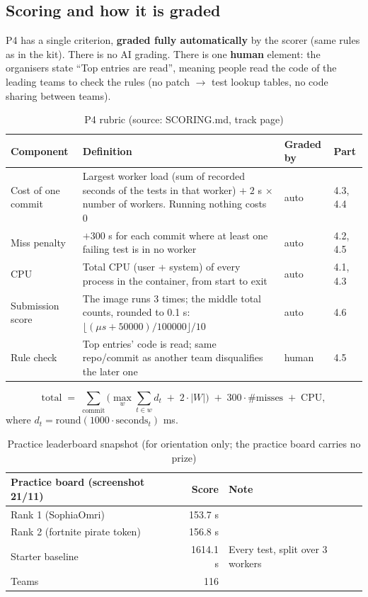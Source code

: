 \documentclass[a4paper,12pt]{article}
\newcommand{\src}[1]{{\footnotesize\textcolor{p7}{(source: #1)}}}
\newcommand{\fn}[1]{\texttt{\detokenize{#1}}}
\begin{document}
\subsection{Scoring and how it is graded}
P4 has a single criterion, \textbf{graded fully automatically} by the scorer (same rules as \fn{score.py} in the kit). There is no AI grading. There is one \textbf{human} element: the organisers state ``Top entries are read'', meaning people read the code of the leading teams to check the rules (no patch $\rightarrow$ test lookup tables, no code sharing between teams).

\begin{table}[H]
\centering\small
\begin{tabularx}{\textwidth}{L{3.6cm}Y C{1.9cm}C{1.4cm}}
\toprule
\textbf{Component} & \textbf{Definition} & \textbf{Graded by} & \textbf{Part} \\
\midrule
Cost of one commit & Largest worker load (sum of recorded seconds of the tests in that worker) $+\;2$ s $\times$ number of workers. Running nothing costs 0 & auto & 4.3, 4.4 \\
Miss penalty & $+300$ s for each commit where at least one failing test is in no worker & auto & 4.2, 4.5 \\
CPU & Total CPU (user + system) of every process in the container, from start to exit & auto & 4.1, 4.3 \\
Submission score & The image runs 3 times; the middle total counts, rounded to 0.1 s: $\lfloor(\mu s+50000)/100000\rfloor/10$ & auto & 4.6 \\
Rule check & Top entries' code is read; same repo/commit as another team disqualifies the later one & human & 4.5 \\
\bottomrule
\end{tabularx}
\caption{P4 rubric \src{SCORING.md, track page}}
\end{table}

\[
\text{total} \;=\; \sum_{\text{commit}}\Big(\max_{w}\sum_{t\in w} d_t \;+\; 2\cdot|W|\Big) \;+\; 300\cdot \#\text{misses} \;+\; \text{CPU},
\]
where $d_t=\mathrm{round}(1000\cdot\text{seconds}_t)$ ms.

\begin{table}[H]
\centering\small
\begin{tabular}{lrl}
\toprule
\textbf{Practice board (screenshot 21/11)} & \textbf{Score} & \textbf{Note} \\
\midrule
Rank 1 (SophiaOmri) & 153.7 s & \\
Rank 2 (fortnite pirate token) & 156.8 s & \\
Starter baseline & 1614.1 s & Every test, split over 3 workers \\
Teams & 116 & \\
\bottomrule
\end{tabular}
\caption{Practice leaderboard snapshot (for orientation only; the practice board carries no prize)}
\end{table}
\end{document}
